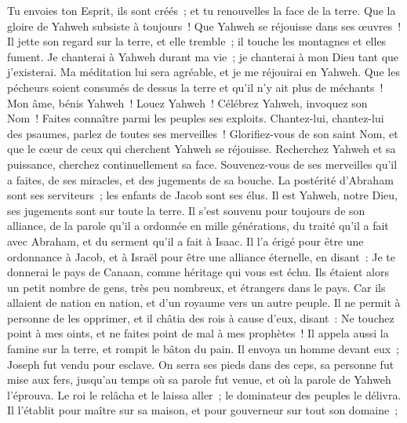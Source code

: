 \begin{multicols}{2}
Tu envoies ton Esprit, ils sont créés~; et tu renouvelles la face de la terre.
Que la gloire de Yahweh subsiste à toujours~! Que Yahweh se réjouisse dans ses œuvres~!
Il jette son regard sur la terre, et elle tremble~; il touche les montagnes et elles fument.
Je chanterai à Yahweh durant ma vie~; je chanterai à mon Dieu tant que j'existerai.
Ma méditation lui sera agréable, et je me réjouirai en Yahweh.
Que les pécheurs soient consumés de dessus la terre et qu'il n'y ait plus de méchants~! Mon âme, bénis Yahweh~! Louez Yahweh~!
\VerseOne{}Célébrez Yahweh, invoquez son Nom~! Faites connaître parmi les peuples ses exploits.
Chantez-lui, chantez-lui des psaumes, parlez de toutes ses merveilles~!
Glorifiez-vous de son saint Nom, et que le cœur de ceux qui cherchent Yahweh se réjouisse.
Recherchez Yahweh et sa puissance, cherchez continuellement sa face.
Souvenez-vous de ses merveilles qu'il a faites, de ses miracles, et des jugements de sa bouche.
La postérité d'Abraham sont ses serviteurs~; les enfants de Jacob sont ses élus.
Il est Yahweh, notre Dieu, ses jugements sont sur toute la terre.
Il s'est souvenu pour toujours de son alliance, de la parole qu'il a ordonnée en mille générations,
du traité qu'il a fait avec Abraham, et du serment qu'il a fait à Isaac.
Il l'a érigé pour être une ordonnance à Jacob, et à Israël pour être une alliance éternelle,
en disant~: Je te donnerai le pays de Canaan, comme héritage qui vous est échu.
Ils étaient alors un petit nombre de gens, très peu nombreux, et étrangers dans le pays.
Car ils allaient de nation en nation, et d'un royaume vers un autre peuple.
Il ne permit à personne de les opprimer, et il châtia des rois à cause d'eux,
disant~: Ne touchez point à mes oints, et ne faites point de mal à mes prophètes~!
Il appela aussi la famine sur la terre, et rompit le bâton du pain.
Il envoya un homme devant eux~; Joseph fut vendu pour esclave.
On serra ses pieds dans des ceps, sa personne fut mise aux fers,
jusqu'au temps où sa parole fut venue, et où la parole de Yahweh l'éprouva.
Le roi le relâcha et le laissa aller~; le dominateur des peuples le délivra.
Il l'établit pour maître sur sa maison, et pour gouverneur sur tout son domaine~;

\end{multicols}
